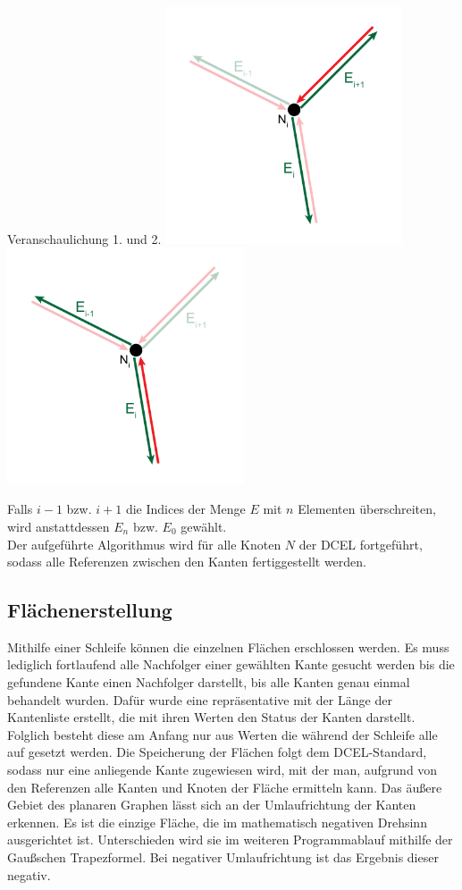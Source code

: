 \begin{Bild}{Veranschaulichung 1. und 2.}
	\includegraphics[width = 70mm]{Bilder/Beziehung1Kanten}
		\includegraphics[width = 70mm]{Bilder/Beziehung2Kanten}
\end{Bild}
Falls $i-1$ bzw. $i+1$ die Indices der Menge $E$ mit $n$ Elementen überschreiten, wird anstattdessen $E_n$ bzw. $E_0$ gewählt. \\
Der aufgeführte Algorithmus wird für alle Knoten $N$ der DCEL fortgeführt, sodass alle Referenzen zwischen den Kanten fertiggestellt werden. 

\subsection{Flächenerstellung}
Mithilfe einer Schleife können die einzelnen Flächen erschlossen werden.
Es muss lediglich fortlaufend alle Nachfolger einer gewählten Kante gesucht werden bis die gefundene Kante einen Nachfolger darstellt, bis alle Kanten genau einmal behandelt wurden.
Dafür wurde eine repräsentative  mit der Länge der Kantenliste erstellt, die mit ihren Werten den Status der Kanten darstellt.
Folglich besteht diese am Anfang nur aus  Werten die während der Schleife alle auf  gesetzt werden.
Die Speicherung der Flächen folgt dem DCEL-Standard, sodass nur eine anliegende Kante zugewiesen wird, mit der man, aufgrund von den Referenzen alle Kanten und Knoten der Fläche ermitteln kann.
Das äußere Gebiet des planaren Graphen lässt sich an der Umlaufrichtung der Kanten erkennen.
Es ist die einzige Fläche, die im mathematisch negativen Drehsinn ausgerichtet ist.
Unterschieden wird sie im weiteren Programmablauf mithilfe der Gaußschen Trapezformel.
Bei negativer Umlaufrichtung ist das Ergebnis dieser negativ.\\

